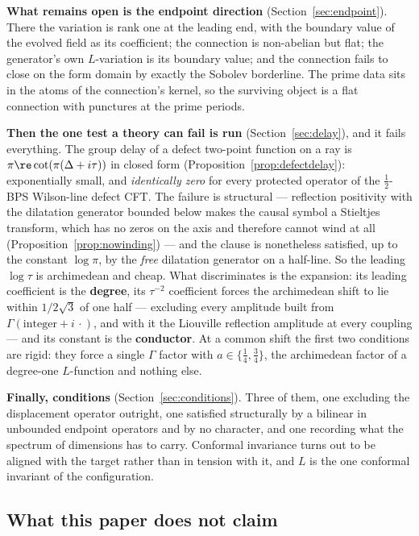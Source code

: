\textbf{What remains open is the endpoint direction} (Section~\ref{sec:endpoint}).
There the variation is rank one at the leading end, with the boundary value of
the evolved field as its coefficient; the connection is non-abelian but flat; the
generator's own $L$-variation is its boundary value; and the connection fails to
close on the form domain by exactly the Sobolev borderline. The prime data sits
in the atoms of the connection's kernel, so the surviving object is a flat
connection with punctures at the prime periods.

\textbf{Then the one test a theory can fail is run} (Section~\ref{sec:delay}),
and it fails everything. The group delay of a defect two-point function on a ray
is $\pi\re\cot(\pi(\Delta+i\tau))$ in closed form
(Proposition~\ref{prop:defectdelay}): exponentially small, and \emph{identically
zero} for every protected operator of the $\frac12$-BPS Wilson-line defect CFT.
The failure is structural --- reflection positivity with the dilatation generator
bounded below makes the causal symbol a Stieltjes transform, which has no zeros on
the axis and therefore cannot wind at all
(Proposition~\ref{prop:nowinding}) --- and the clause is nonetheless satisfied,
up to the constant $\log\pi$, by the \emph{free} dilatation generator on a
half-line. So the leading $\log\tau$ is archimedean and cheap. What
discriminates is the expansion: its leading coefficient is the \textbf{degree},
its $\tau^{-2}$ coefficient forces the archimedean shift to lie within
$1/2\sqrt3$ of one half --- excluding every amplitude built from
$\Gamma(\text{integer}+i\,\cdot)$, and with it the Liouville reflection
amplitude at every coupling --- and its constant is the \textbf{conductor}. At a
common shift the first two conditions are rigid: they force a single
$\Gamma$ factor with $a\in\{\frac14,\frac34\}$, the archimedean factor of a
degree-one $L$-function and nothing else.

\textbf{Finally, conditions} (Section~\ref{sec:conditions}). Three of them, one
excluding the displacement operator outright, one satisfied structurally by a
bilinear in unbounded endpoint operators and by no character, and one recording
what the spectrum of dimensions has to carry. Conformal invariance turns out to be
aligned with the target rather than in tension with it, and $L$ is the one
conformal invariant of the configuration.

\subsection*{What this paper does not claim}

